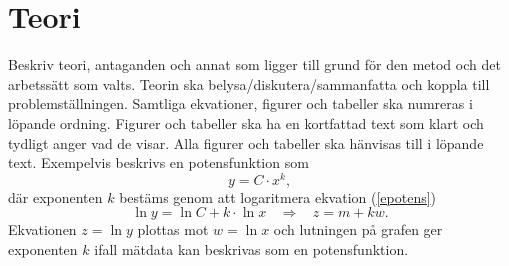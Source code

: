 \documentclass[a4paper]{article}
\begin{document}
%
%

\section{Teori}
Beskriv teori, antaganden och annat som ligger till grund för den metod och det arbetssätt som valts. Teorin ska belysa/diskutera/sammanfatta och koppla till problemställningen. Samtliga ekvationer, figurer och tabeller ska numreras i löpande ordning. Figurer och tabeller ska ha en kortfattad text som klart och tydligt anger vad de visar. Alla figurer och tabeller ska hänvisas till i löpande text.
Exempelvis beskrivs en potensfunktion som
\begin{equation} \label{epotens}
    y=C\cdot x^k,
\end{equation}
där exponenten $k$ bestäms genom att logaritmera ekvation (\ref{epotens})
\begin{equation}
    \ln y = \ln C + k\cdot \ln x \:\:\:\: \Rightarrow \:\:\:\: z = m + kw.
\end{equation}
Ekvationen $z = \ln y$ plottas mot $w = \ln x$ och lutningen på grafen ger exponenten $k$ ifall mätdata kan beskrivas som en potensfunktion.

%
\end{document}
